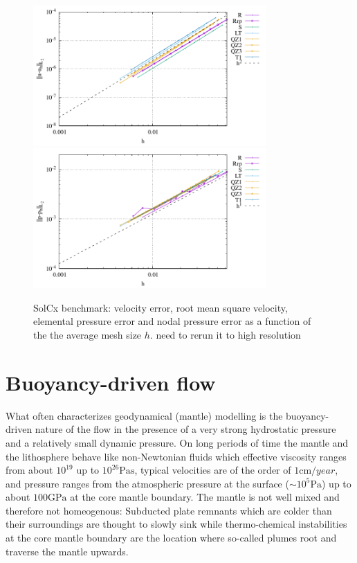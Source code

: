 \documentclass[a4paper,12pt]{article}
\begin{document}
\begin{figure}
\centering
\includegraphics[width=8.9cm]{../results/errors_u_exp13}
\includegraphics[width=8.9cm]{../results/errors_p_exp13}
\caption{SolCx benchmark: velocity error, 
root mean square velocity, elemental pressure error and nodal pressure error
as a function of the the average mesh size $h$.
{\color{red} need to rerun it to high resolution}} 
\label{fig:ressolcx}
\end{figure}




\section{Buoyancy-driven flow}



What often characterizes geodynamical (mantle) modelling is the buoyancy-driven nature of the flow 
in the presence of a very strong hydrostatic pressure and a relatively small dynamic pressure.
On long periods of time the mantle and the lithosphere behave like non-Newtonian fluids
which effective viscosity ranges from about $10^{19}$ up to $10^{26}\si{\pascal\second}$, 
typical velocities are of the order of $1\si{\cm\per year}$, and pressure ranges from 
the atmospheric pressure at the surface ($\sim 10^5 \si{\pascal}$) up to about $100\si{\giga\pascal}$ 
at the core mantle boundary. The mantle is not well mixed and therefore not homeogenous: 
Subducted plate remnants which are colder than their surroundings are thought to slowly sink 
while thermo-chemical instabilities at the core mantle boundary are the location where 
so-called plumes root and traverse the mantle upwards.
\end{document}
